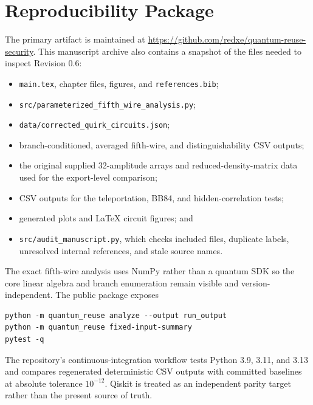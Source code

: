 \section{Reproducibility Package}
\label{app:reproducibility}

The primary artifact is maintained at
\url{https://github.com/redxe/quantum-reuse-security}. This manuscript archive
also contains a snapshot of the files needed to inspect Revision 0.6:

\begin{itemize}
  \item \texttt{main.tex}, chapter files, figures, and
  \texttt{references.bib};
  \item \texttt{src/parameterized\_fifth\_wire\_analysis.py};
  \item \texttt{data/corrected\_quirk\_circuits.json};
  \item branch-conditioned, averaged fifth-wire, and distinguishability CSV
  outputs;
  \item the original supplied 32-amplitude arrays and reduced-density-matrix
  data used for the export-level comparison;
  \item CSV outputs for the teleportation, BB84, and hidden-correlation tests;
  \item generated plots and LaTeX circuit figures; and
  \item \texttt{src/audit\_manuscript.py}, which checks included files,
  duplicate labels, unresolved internal references, and stale source names.
\end{itemize}

The exact fifth-wire analysis uses NumPy rather than a quantum SDK so the core
linear algebra and branch enumeration remain visible and version-independent.
The public package exposes
\begin{lstlisting}[style=python]
python -m quantum_reuse analyze --output run_output
python -m quantum_reuse fixed-input-summary
pytest -q
\end{lstlisting}
The repository's continuous-integration workflow tests Python 3.9, 3.11, and
3.13 and compares regenerated deterministic CSV outputs with committed
baselines at absolute tolerance $10^{-12}$. Qiskit is treated as an independent
parity target rather than the present source of truth.
